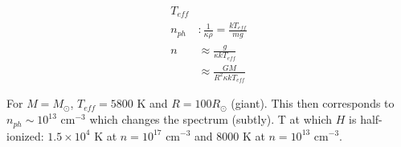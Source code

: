 \documentclass[10pt,letterpaper,final]{book}
\begin{document}
\begin{align}
T_{eff} \\
n_{ph} &: \frac{1}{\kappa \rho} = \frac{kT_{eff}}{mg}\\
n &\approx \frac{g}{\kappa kT_{eff}}\\
&\approx \frac{GM}{R^2 \kappa kT_{eff}}
\end{align}

For $M = M_\odot$, $T_{eff} = 5800$ K and $R = 100R_\odot$ (giant). This then corresponds to $n_{ph} \sim 10^{13}$ cm$^{-3}$ which changes the spectrum (subtly). T at which $H$ is half-ionized: $1.5 \times 10^4$ K at $n=10^{17}$ cm$^{-3}$ and $8000$ K at $n = 10^{13}$ cm$^{-3}$. 

\end{document}
